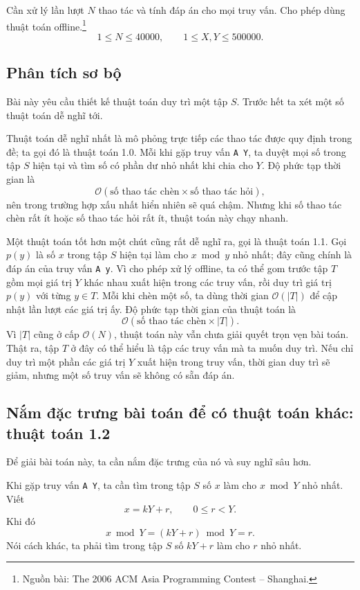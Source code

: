 \documentclass[11pt]{article}
\newcommand{\Oh}{\mathcal{O}}
\begin{document}
Cần xử lý lần lượt $N$ thao tác và tính đáp án cho mọi truy vấn. Cho phép dùng
thuật toán offline.\footnote{Nguồn bài: The 2006 ACM Asia Programming Contest
-- Shanghai.}
\[
  1\le N\le 40000,\qquad 1\le X,Y\le 500000.
\]

\subsection{Phân tích sơ bộ}

Bài này yêu cầu thiết kế thuật toán duy trì một tập $S$. Trước hết ta xét một
số thuật toán dễ nghĩ tới.

Thuật toán dễ nghĩ nhất là mô phỏng trực tiếp các thao tác được quy định trong
đề; ta gọi đó là thuật toán 1.0. Mỗi khi gặp truy vấn \texttt{A Y}, ta duyệt
mọi số trong tập $S$ hiện tại và tìm số có phần dư nhỏ nhất khi chia cho $Y$.
Độ phức tạp thời gian là
\[
  \Oh(\text{số thao tác chèn}\times \text{số thao tác hỏi}),
\]
nên trong trường hợp xấu nhất hiển nhiên sẽ quá chậm. Nhưng khi số thao tác
chèn rất ít hoặc số thao tác hỏi rất ít, thuật toán này chạy nhanh.

Một thuật toán tốt hơn một chút cũng rất dễ nghĩ ra, gọi là thuật toán 1.1.
Gọi $p(y)$ là số $x$ trong tập $S$ hiện tại làm cho $x\bmod y$ nhỏ nhất; đây
cũng chính là đáp án của truy vấn \texttt{A y}. Vì cho phép xử lý offline, ta
có thể gom trước tập $T$ gồm mọi giá trị $Y$ khác nhau xuất hiện trong các
truy vấn, rồi duy trì giá trị $p(y)$ với từng $y\in T$. Mỗi khi chèn một số,
ta dùng thời gian $\Oh(|T|)$ để cập nhật lần lượt các giá trị ấy. Độ phức tạp
thời gian của thuật toán là
\[
  \Oh(\text{số thao tác chèn}\times |T|).
\]
Vì $|T|$ cũng ở cấp $\Oh(N)$, thuật toán này vẫn chưa giải quyết trọn vẹn bài
toán. Thật ra, tập $T$ ở đây có thể hiểu là tập các truy vấn mà ta muốn duy
trì. Nếu chỉ duy trì một phần các giá trị $Y$ xuất hiện trong truy vấn, thời
gian duy trì sẽ giảm, nhưng một số truy vấn sẽ không có sẵn đáp án.

\subsection{Nắm đặc trưng bài toán để có thuật toán khác: thuật toán 1.2}

Để giải bài toán này, ta cần nắm đặc trưng của nó và suy nghĩ sâu hơn.

Khi gặp truy vấn \texttt{A Y}, ta cần tìm trong tập $S$ số $x$ làm cho
$x\bmod Y$ nhỏ nhất. Viết
\[
  x=kY+r,\qquad 0\le r<Y.
\]
Khi đó
\[
  x\bmod Y=(kY+r)\bmod Y=r.
\]
Nói cách khác, ta phải tìm trong tập $S$ số $kY+r$ làm cho $r$ nhỏ nhất.
\end{document}
